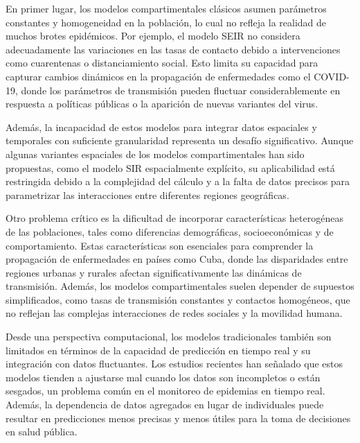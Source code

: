 En primer lugar, los modelos compartimentales clásicos asumen parámetros constantes y homogeneidad en la población, lo cual no refleja la realidad de muchos brotes epidémicos\cite{Moein2021SIRInefficiency}. Por ejemplo, el modelo SEIR no considera adecuadamente las variaciones en las tasas de contacto debido a intervenciones como cuarentenas o distanciamiento social. Esto limita su capacidad para capturar cambios dinámicos en la propagación de enfermedades como el COVID-19, donde los parámetros de transmisión pueden fluctuar considerablemente en respuesta a políticas públicas o la aparición de nuevas variantes del virus\cite{Rizzo2020AutoSEIR, Baccega2024Sybil}.

Además, la incapacidad de estos modelos para integrar datos espaciales y temporales con suficiente granularidad representa un desafío significativo\cite{Nowzari2016ComplexNetworks}. Aunque algunas variantes espaciales de los modelos compartimentales han sido propuestas, como el modelo SIR espacialmente explícito, su aplicabilidad está restringida debido a la complejidad del cálculo y a la falta de datos precisos para parametrizar las interacciones entre diferentes regiones geográficas\cite{Mata2021MathematicalEpidemics}.

Otro problema crítico es la dificultad de incorporar características heterogéneas de las poblaciones, tales como diferencias demográficas, socioeconómicas y de comportamiento. Estas características son esenciales para comprender la propagación de enfermedades en países como Cuba, donde las disparidades entre regiones urbanas y rurales afectan significativamente las dinámicas de transmisión\cite{Rodriguez2022DataCentric, Nguyen2023NZSTGNN}. Además, los modelos compartimentales suelen depender de supuestos simplificados, como tasas de transmisión constantes y contactos homogéneos, que no reflejan las complejas interacciones de redes sociales y la movilidad humana\cite{Nguyen2023NZSTGNN}.

Desde una perspectiva computacional, los modelos tradicionales también son limitados en términos de la capacidad de predicción en tiempo real y su integración con datos fluctuantes. Los estudios recientes han señalado que estos modelos tienden a ajustarse mal cuando los datos son incompletos o están sesgados, un problema común en el monitoreo de epidemias en tiempo real\cite{Shinde2020ForecastingCOVID, Chowell2016EarlyGrowth}. Además, la dependencia de datos agregados en lugar de individuales puede resultar en predicciones menos precisas y menos útiles para la toma de decisiones en salud pública\cite{Santangelo2023MachineLearning}.

